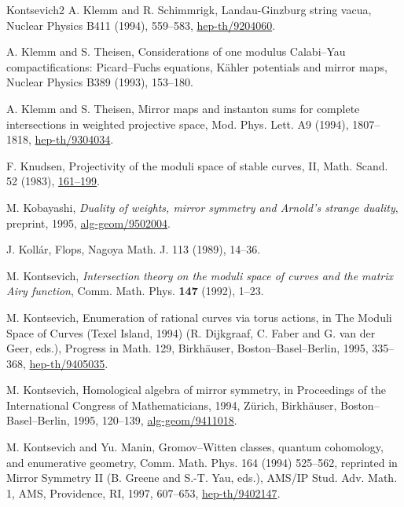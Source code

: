 \begin{thebibliography}{Kontsevich2}
\hypertarget{bib:KS}{}
A. Klemm and R. Schimmrigk, Landau-Ginzburg string vacua,
Nuclear Physics B411 (1994), 559--583, \href{https://arxiv.org/abs/hep-th/9204060}{hep-th/9204060}.

\hypertarget{bib:KT1}{}
A. Klemm and S. Theisen,
Considerations of one modulus Calabi--Yau compactifications:
Picard--Fuchs equations, Kähler potentials and mirror maps,
Nuclear Physics B389 (1993), 153--180.

\hypertarget{bib:KT2}{}
A. Klemm and S. Theisen, Mirror maps and instanton sums for complete intersections in weighted projective space, Mod. Phys. Lett. A9 (1994), 1807--1818, \href{https://arxiv.org/abs/hep-th/9304034}{hep-th/9304034}.

\hypertarget{bib:Knudsen}{}
F. Knudsen, Projectivity of the moduli space of stable curves, II, Math. Scand. 52 (1983), \href{https://www.mscand.dk/article/view/12001}{161--199}.


\hypertarget{bib:Kobayashi}{} M. Kobayashi, \emph{Duality of weights, mirror symmetry and Arnold's strange duality}, preprint, 1995, \href{https://arxiv.org/abs/alg-geom/9502004}{alg-geom/9502004}.

\hypertarget{bib:Kollar}{}
J. Kollár, Flops, Nagoya Math. J. 113 (1989), 14--36.

\hypertarget{bib:Kontsevich1}{}
M. Kontsevich, \emph{Intersection theory on the moduli space of curves and the matrix Airy function}, Comm. Math. Phys. \textbf{147} (1992), 1--23.

\hypertarget{bib:Kontsevich2}{}
M. Kontsevich, Enumeration of rational curves via torus actions,
in The Moduli Space of Curves (Texel Island, 1994)
(R. Dijkgraaf, C. Faber and G. van der Geer, eds.),
Progress in Math. 129, Birkhäuser, Boston--Basel--Berlin, 1995,
335--368, \href{https://arxiv.org/abs/hep-th/9405035}{hep-th/9405035}.

\hypertarget{bib:Kontsevich3}{}
M. Kontsevich, Homological algebra of mirror symmetry,
in Proceedings of the International Congress of Mathematicians,
1994, Zürich, Birkhäuser, Boston--Basel--Berlin, 1995,
120--139, \href{https://arxiv.org/abs/alg-geom/9411018}{alg-geom/9411018}.

\hypertarget{bib:KoM1}{}
M. Kontsevich and Yu. Manin, Gromov--Witten classes, quantum cohomology, and enumerative geometry, Comm. Math. Phys. 164 (1994) 525--562, reprinted in Mirror Symmetry II (B. Greene and S.-T. Yau, eds.), AMS/IP Stud. Adv. Math. 1, AMS, Providence, RI, 1997, 607--653, \href{https://arxiv.org/abs/hep-th/9402147}{hep-th/9402147}.


\end{thebibliography}
